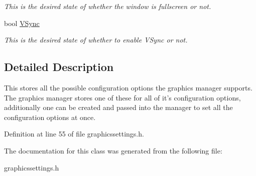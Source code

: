 \begin{DoxyCompactItemize}
\begin{DoxyCompactList}\small\item\em This is the desired state of whether the window is fullscreen or not. \item\end{DoxyCompactList}\item 
\hypertarget{structphys_1_1GraphicsSettings_ade8df051b7da492f0b48014edfca532a}{
bool \hyperlink{structphys_1_1GraphicsSettings_ade8df051b7da492f0b48014edfca532a}{VSync}}
\label{d0/dd0/structphys_1_1GraphicsSettings_ade8df051b7da492f0b48014edfca532a}

\begin{DoxyCompactList}\small\item\em This is the desired state of whether to enable VSync or not. \item\end{DoxyCompactList}\end{DoxyCompactItemize}


\subsection{Detailed Description}
This stores all the possible configuration options the graphics manager supports. The graphics manager stores one of these for all of it's configuration options, additionally one can be created and passed into the manager to set all the configuration options at once. 

Definition at line 55 of file graphicssettings.h.



The documentation for this class was generated from the following file:\begin{DoxyCompactItemize}
\item 
graphicssettings.h\end{DoxyCompactItemize}
